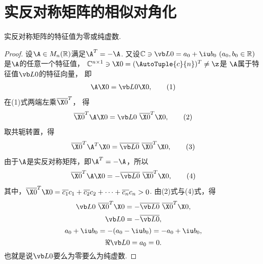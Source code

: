 \section{实反对称矩阵的相似对角化}
\begin{theorem}
实反对称矩阵的特征值为零或纯虚数.
\begin{proof}
设\(\A \in M_n(\mathbb{R})\)满足\(\A^T=-\A\).
又设\(\mathbb{C} \ni \L0 = a_0 + \iu b_0\ (a_0,b_0 \in \mathbb{R})\)是\(\A\)的任意一个特征值，
\(\mathbb{C}^{n \times 1} \ni \X0=(\AutoTuple{c}{n})^T \neq \z\)是
\(\A\)属于特征值\(\L0\)的特征向量，
即\begin{gather}
\A\X0 = \L0\X0, \tag1
\end{gather}
在(1)式两端左乘\(\overline{\X0}^T\)，
得\begin{gather}
	\overline{\X0}^T \A \X0
	= \L0\ \overline{\X0}^T \X0, \tag2
\end{gather}
取共轭转置，得\begin{gather}
\overline{\X0}^T \A^T \X0
= \overline{\L0}\ \overline{\X0}^T \X0, \tag3
\end{gather}
由于\(\A\)是实反对称矩阵，即\(\A^T = -\A\)，所以\begin{gather}
	\overline{\X0}^T \A \X0
	= -\overline{\L0}\ \overline{\X0}^T \X0, \tag4
\end{gather}
其中，\(\overline{\X0}^T \X0
= \overline{c_1}c_1 + \overline{c_2}c_2 + \dotsb + \overline{c_n}{c_n} > 0\).
由(2)式与(4)式，得\[
	\L0\ \overline{\X0}^T \X0
	= -\overline{\L0}\ \overline{\X0}^T \X0,
\]\[
	\L0 = -\overline{\L0},
\]\[
	a_0 + \iu b_0 = -(a_0 - \iu b_0) = -a_0 + \iu b_0,
\]\[
	\Re \L0 = a_0 = 0.
\]
也就是说\(\L0\)要么为零要么为纯虚数.
\end{proof}
\end{theorem}
